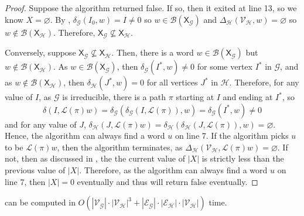 \documentclass[hidelinks]{article}
\newcommand{\Lc}{\mathcal{L}}  %
\newcommand{\Gc}{\mathcal{G}}  %
\newcommand{\Hc}{\mathcal{H}}  %
\newcommand{\Vc}{\mathcal{V}}
\newcommand{\Ec}{\mathcal{E}}
\newcommand{\Bc}{\mathcal{B}}
\newcommand{\shift}[1]{\mathsf{X}_{#1}}
\theoremstyle{definition}
\begin{document}
\begin{proof}
    Suppose the algorithm returned false. If so, then it exited at line 13, so we 
    know \(X = \varnothing\). By , \(\delta_\Gc(I_0, w) = I \neq 0\) so 
    \(w \in \Bc(\shift{\Gc})\) and \(\Delta_\Hc(\Vc_\Hc, w) = \varnothing\) so \(w \notin \Bc(\shift{\Hc})\).
    Therefore, \(\shift{\Gc} \nsubseteq \shift{\Hc}\). 

    Conversely, suppose \(\shift{\Gc} \nsubseteq \shift{\Hc}\). Then, there 
    is a word \(w \in \Bc(\shift{\Gc})\)
    but \(w \notin \Bc(\shift{\Hc})\). As \(w \in \Bc(\shift{\Gc})\), then \(\delta_\Gc(I^*, w) \neq 0\)
    for some vertex \(I^*\) in \(\Gc\), and as \(w \notin \Bc(\shift{\Hc})\), then 
    \(\delta_\Hc(J^*, w) = 0\) for all vertices \(J^*\) in \(\Hc\). Therefore, for 
    any value of \(I\), as \(\Gc\) is irreducible, there is a path 
    \(\pi\) starting at \(I\) and ending at \(I^*\), so 
    \[\delta(I, \Lc(\pi)w) = \delta_\Gc(\delta_\Gc(I, \Lc(\pi)), w) = \delta_\Gc(I^*, w) \neq 0\]
    and for any value of \(J\), \(\delta_\Hc(J, \Lc(\pi)w) = \delta_\Hc(\delta_\Hc(J, \Lc(\pi)), w) = \varnothing\).
    Hence, the algorithm can always find a word \(u\) on line 7. If the algorithm picks \(u\) to be \(\Lc(\pi)w\), 
    then the algorithm terminates, as \(\Delta_\Hc(\Vc_\Hc, \Lc(\pi)w) = \varnothing\).
    If not, then as discussed in , the the current value of \(|X|\)
    is strictly less than the previous value of \(|X|\). Therefore, as the algorithm 
    can always find a word \(u\) on line 7, then \(|X| = 0\) eventually and 
    thus will return false eventually. 
\end{proof}

\begin{theorem}
     can be computed in \(O(|\Vc_\Gc|\cdot|\Vc_\Hc|^3 + |\Ec_\Gc|\cdot|\Ec_\Hc|\cdot|\Vc_\Hc|)\) time.
\end{theorem}
\end{document}
